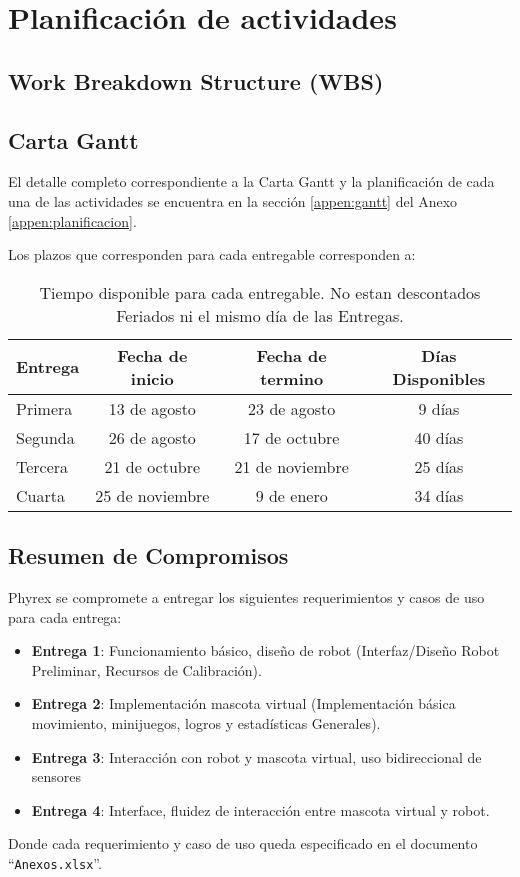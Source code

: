 \chapter{Planificaci\'on de actividades}
\newpage
\section[Work Breakdown Structure (WBS)]{Work Breakdown Structure (WBS)}
\section{Carta Gantt}
El detalle completo correspondiente a la Carta Gantt y la planificaci\'on de cada una de las actividades se encuentra en la secci\'on \ref{appen:gantt} del Anexo \ref{appen:planificacion}.

Los plazos que corresponden para cada entregable corresponden a:
\begin{table}[H]
  \centering
  \begin{tabular}{|l|c|c|c|}\hline
    {\bf Entrega} & {\bf Fecha de inicio} & {\bf Fecha de termino} & {\bf D\'ias Disponibles}\\\hline
    Primera & 13 de agosto    & 23 de agosto    &  9 d\'ias \\\hline
    Segunda & 26 de agosto    & 17 de octubre   & 40 d\'ias \\\hline 
    Tercera & 21 de octubre   & 21 de noviembre & 25 d\'ias \\\hline 
    Cuarta  & 25 de noviembre & 9 de enero      & 34 d\'ias \\\hline 
  \end{tabular}
  \label{tab:Fechas}
  \caption[~Tiempo Disponible para Entregables]{Tiempo disponible para cada entregable. No estan descontados Feriados ni el mismo d\'ia de las Entregas.}
\end{table}



\section{Resumen de Compromisos}
Phyrex se compromete a entregar los siguientes requerimientos y casos de uso para cada entrega:

\begin{itemize}
\item {\bf Entrega 1}: Funcionamiento b\'asico, dise\~no de robot (Interfaz/Dise\~no Robot Preliminar, Recursos de Calibraci\'on).
\item {\bf Entrega 2}: Implementaci\'on mascota virtual (Implementaci\'on b\'asica movimiento, minijuegos, logros y estad\'isticas Generales).
\item {\bf Entrega 3}: Interacci\'on con robot y mascota virtual, uso bidireccional de sensores
\item {\bf Entrega 4}: Interface, fluidez de interacci\'on entre mascota virtual y robot.
\end{itemize}

Donde cada requerimiento y caso de uso queda especificado en el documento ``\verb+Anexos.xlsx+''.
\newpage
